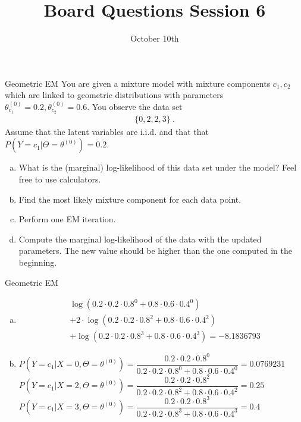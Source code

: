 \documentclass{beamer}\usepackage[]{graphicx}\usepackage[]{color}
\title{Board Questions Session 6}
\date{October 10th}
\begin{document}
\begin{frame}{Geometric EM}
\small
You are given a mixture model with mixture components $ c_{1},c_{2} $ which are linked to geometric
distributions with parameters $ \theta^{(0)}_{c_{1}} = 0.2, \theta^{(0)}_{c_{2}} = 0.6 $. You
observe the data set
\begin{align*}
\{0, 2, 2, 3\} \ .
\end{align*}
Assume that the latent variables are i.i.d. and that that $ P(Y=c_{1}|\Theta=\theta^{(0)}) = 0.2 $.
\begin{enumerate}[a)]
\item What is the (marginal) log-likelihood of this data set under the model? Feel free to use
calculators.
\item Find the most likely mixture component for each data point.
\item Perform one EM iteration.
\item Compute the marginal log-likelihood of the data with the updated parameters. The new value
should be higher than the one computed in the beginning.
\end{enumerate}
\end{frame}

\begin{frame}{Geometric EM}
\small
\begin{enumerate}[a)]
\item \begin{align*}
&\log(0.2\cdot 0.2\cdot 0.8^{0} + 0.8 \cdot 0.6 \cdot 0.4^{0}) \\
&+ 2\cdot \log(0.2\cdot 0.2 \cdot 0.8^{2} + 0.8\cdot 0.6 \cdot 0.4^{2}) \\
&+ \log(0.2\cdot 0.2 \cdot 0.8^{3} + 0.8\cdot 0.6 \cdot 0.4^{3})
= \ensuremath{-8.1836793}
\end{align*}
\item $ P(Y = c_{1}|X=0, \Theta=\theta^{(0)}) = \dfrac{0.2\cdot 0.2\cdot 0.8^{0}}{0.2\cdot 0.2\cdot 0.8^{0} + 0.8 \cdot 0.6 \cdot 0.4^{0}} = 0.0769231 $
\\ \vspace{.4cm}
$ P(Y = c_{1}|X=2, \Theta=\theta^{(0)}) = \dfrac{0.2\cdot 0.2\cdot 0.8^{2}}{0.2\cdot 0.2\cdot 0.8^{2} + 0.8 \cdot 0.6 \cdot 0.4^{2}} = 0.25 $
\\ \vspace{.4cm}
$ P(Y = c_{1}|X=3, \Theta=\theta^{(0)}) = \dfrac{0.2\cdot 0.2\cdot 0.8^{3}}{0.2\cdot 0.2\cdot 0.8^{3} + 0.8 \cdot 0.6 \cdot 0.4^{3}} = 0.4 $
\end{enumerate}
\end{frame}
\end{document}
